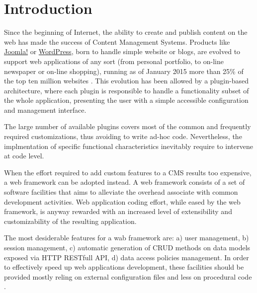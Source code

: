\section{Introduction}\label{sec:introduction}

Since the beginning of Internet, the ability to create and publish content on the web has made the success of Content Management Systems. Products like \href{http://www.joomla.org/}{Joomla!} or \href{https://wordpress.org/}{WordPress}, born to handle simple website or blogs, are evolved to support web applications of any sort (from personal portfolio, to on-line newspaper or on-line shopping), running as of January 2015 more than 25\% of the top ten million websites \cite{usage-cms}. This evolution has been allowed by a plugin-based architecture, where each plugin is responsible to handle a functionality subset of the whole application, presenting the user with a simple accessible configuration and management interface.

The large number of available plugins covers most of the common and frequently required customizations, thus avoiding to write ad-hoc code. Nevertheless, the implmentation of specific functional characteristics inevitably require to intervene at code level.

When the effort required to add custom features to a CMS results too expensive, a web framework can be adopted instead. A web framework consists of a set of software facilities that aims to alleviate the overhead associate with common development activities. Web application coding effort, while eased by the web framework, is anyway rewarded with an increased level of extensibility and customizability of the resulting application.

The most desiderable features for a wab framework are: a) user management, b) session management, c) automatic generation of CRUD methods on data models exposed via HTTP RESTfull API, d) data access policies management. In order to effectively speed up web applications development, these facilities should be provided mostly reling on external configuration files and less on procedural code \cite{6859693}.


